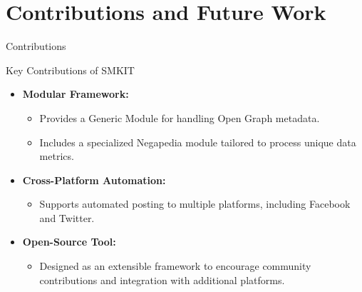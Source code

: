 \documentclass{beamer}
\begin{document}
\section{Contributions and Future Work}
    \begin{frame}{Contributions}
        \begin{block}{Key Contributions of SMKIT}
            \begin{itemize}
                \item \textbf{Modular Framework:}
                    \begin{itemize}
                        \item Provides a Generic Module for handling Open Graph metadata.
                        \item Includes a specialized Negapedia module tailored to process unique data metrics.
                    \end{itemize}
                \item \textbf{Cross-Platform Automation:}
                    \begin{itemize}
                        \item Supports automated posting to multiple platforms, including Facebook and Twitter.
                    \end{itemize}
                \item \textbf{Open-Source Tool:}
                    \begin{itemize}
                        \item Designed as an extensible framework to encourage community contributions and integration with additional platforms.
                    \end{itemize}
            \end{itemize}
        \end{block}
    \end{frame}
\end{document}

